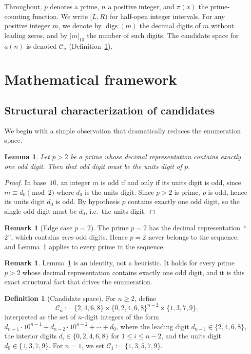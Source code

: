 \documentclass[11pt,a4paper]{article}
\newtheorem{lemma}[theorem]{Lemma}
\theoremstyle{definition}
\newtheorem{definition}[theorem]{Definition}
\newtheorem{remark}[theorem]{Remark}
\begin{document}
Throughout, $p$ denotes a prime, $n$ a positive integer, and $\pi(x)$ the
prime-counting function. We write $[L,R)$ for half-open integer intervals.
For any positive integer $m$, we denote by $\operatorname{digs}(m)$ the
decimal digits of $m$ without leading zeros, and by $|m|_{10}$ the number
of such digits. The candidate space for $a(n)$ is denoted $\mathcal{C}_n$
(Definition~\ref{def:candidate-space}).

\section{Mathematical framework}\label{sec:math}

\subsection{Structural characterization of candidates}

We begin with a simple observation that dramatically reduces the enumeration space.

\begin{lemma}\label{lem:structure}
Let $p > 2$ be a prime whose decimal representation contains exactly one
odd digit. Then that odd digit must be the units digit of $p$.
\end{lemma}

\begin{proof}
In base~$10$, an integer $m$ is odd if and only if its units digit is odd,
since $m \equiv d_0 \pmod{2}$ where $d_0$ is the units digit. Since $p > 2$
is prime, $p$ is odd, hence its units digit $d_0$ is odd. By hypothesis
$p$ contains exactly one odd digit, so the single odd digit must be $d_0$,
i.e.\ the units digit.
\end{proof}

\begin{remark}[Edge case $p=2$]
The prime $p=2$ has the decimal representation~``$2$'', which contains
\emph{zero} odd digits. Hence $p=2$ never belongs to the sequence, and
Lemma~\ref{lem:structure} applies to every prime in the sequence.
\end{remark}

\begin{remark}
Lemma~\ref{lem:structure} is an identity, not a heuristic. It holds for
every prime $p > 2$ whose decimal representation contains exactly one odd
digit, and it is this exact structural fact that drives the enumeration.
\end{remark}

\begin{definition}[Candidate space]\label{def:candidate-space}
For $n \geq 2$, define
\[
  \mathcal{C}_n := \{2,4,6,8\} \times \{0,2,4,6,8\}^{n-2} \times \{1,3,7,9\},
\]
interpreted as the set of $n$-digit integers of the form
$d_{n-1} \cdot 10^{n-1} + d_{n-2}\cdot 10^{n-2} + \cdots + d_0$,
where the leading digit $d_{n-1} \in \{2,4,6,8\}$, the interior digits
$d_i \in \{0,2,4,6,8\}$ for $1 \le i \le n-2$, and the units digit
$d_0 \in \{1,3,7,9\}$. For $n=1$, we set $\mathcal{C}_1 := \{1,3,5,7,9\}$.
\end{definition}
\end{document}
